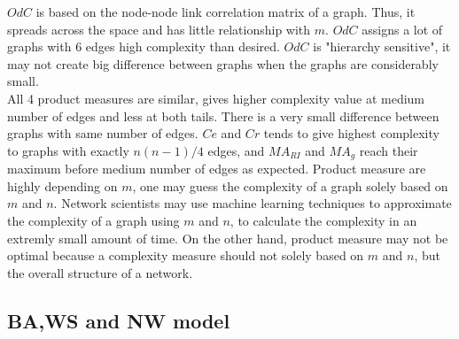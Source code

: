 \documentclass[12pt]{article}
\begin{document}
$OdC$ is based on the node-node link correlation matrix of a graph.\cite{odc} Thus, it spreads across the space and has little relationship with $m$. $OdC$ assigns a lot of graphs with 6 edges high complexity than desired. $OdC$ is "hierarchy sensitive", it may not create big difference between graphs when the graphs are considerably small.\\

All 4 product measures are similar, gives higher complexity value at medium number of edges and less at both tails. There is a very small difference between graphs with same number of edges. $Ce$ and $Cr$ tends to give highest complexity to graphs with exactly $n(n-1)/4$ edges, and $MA_{RI}$ and $MA_{g}$ reach their maximum before medium number of edges as expected. Product measure are highly depending on $m$, one may guess the complexity of a graph solely based on $m$ and $n$. Network scientists may use machine learning techniques to approximate the complexity of a graph using $m$ and $n$, to calculate the complexity in an extremly small amount of time. On the other hand, product measure may not be optimal because a complexity measure should not solely based on $m$ and $n$, but the overall structure of a network.


\subsection{BA,WS and NW model}
\end{document}
